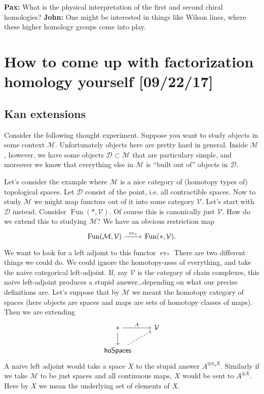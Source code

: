 \documentclass{amsart}
\DeclareMathOperator{\Fun}{Fun}
\DeclareMathOperator{\ev}{ev}
\begin{document}
\textbf{Pax:} What is the physical interpretation of the first and second chiral
homologies? \textbf{John:} One might be interested in things like Wilson lines,
where these higher homology groups come into play.

\section{How to come up with factorization homology yourself [09/22/17]}

\subsection{Kan extensions}

Consider the following
thought experiment. Suppose you want to study objects in some context $\mathcal{M}$.
Unfortunately objects here are pretty hard in general. Inside $\mathcal{M}$, however,
we have some objects $\mathcal{D}\subset \mathcal{M}$ that are particulary simple,
and moreover we know that everything else in $\mathcal{M}$ is ``built out of'' objects in $\mathcal{D}$.

Let's consider the example where $\mathcal{M}$ is a nice category of (homotopy types of)
topological spaces. Let $\mathcal{D}$ consist of the point, i.e. all contractible spaces.
Now to study $\mathcal{M}$ we might map functors out of it into some category $\mathcal{V}$.
Let's start with $\mathcal{D}$ instead. Consider $\Fun(*, \mathcal{V})$.
Of course this is canonically just $\mathcal{V}$. How do we extend this to studying $\mathcal{M}$?
We have an obvious restriction map
\begin{equation*}
    \begin{tikzcd}
        \Fun(\mathcal{M},\mathcal{V}) \rar{\ev_*} & \Fun(*, \mathcal{V}).
    \end{tikzcd}
\end{equation*}
We want to look for a left adjoint to this functor $\ev_*$
There are two different
things we could do. We could ignore the homotopy-ness of everything, and take the naive
categorical left-adjoint. If, say $\mathcal{V}$ is the category of chain complexes, this naive
left-adjoint produces a stupid answer\ldots depending on what our precise definitions are.
Let's suppose that by $\mathcal{M}$ we meant the homotopy category of spaces (here objects are spaces
and maps are sets of homotopy classes of maps).
Then we are extending
\begin{equation*}
    \begin{tikzcd}
        *\rar{A}\dar & \mathcal{V}\\
        \mathsf{hoSpaces}\urar[dashed]
    \end{tikzcd}
\end{equation*}
A naive left adjoint would take a space $X$ to the stupid answer $A^{\oplus \pi_0X}$.
Similarly if we take $\mathcal{M}$ to be just spaces and all continuous maps, $X$ would
be sent to $A^{\oplus X}$. Here by $X$ we mean the underlying set of elements of $X$.
\end{document}
